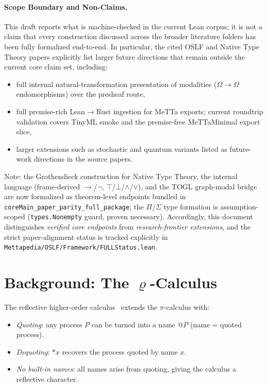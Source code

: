 \documentclass[]{article}
\newcommand{\code}[1]{\texttt{#1}}
\newcommand{\rhocalc}{\ensuremath{\varrho}}
\begin{document}
\paragraph{Scope Boundary and Non-Claims.}
This draft reports what is machine-checked in the current Lean corpus; it is
not a claim that every construction discussed across the broader literature
folders has been fully formalized end-to-end.  In particular, the cited OSLF and
Native Type Theory papers explicitly list larger future directions that remain
outside the current core claim set, including:
\begin{itemize}
\item full internal natural-transformation presentation of modalities
  (\(\Omega \to \Omega\) endomorphisms) over the presheaf route,
\item full premise-rich Lean$\to$Rust ingestion for MeTTa exports;
  current roundtrip validation covers TinyML smoke and the premise-free
  MeTTaMinimal export slice,
\item larger extensions such as stochastic and quantum variants listed as
  future-work directions in the source papers.
\end{itemize}
Note: the Grothendieck construction for Native Type Theory, the internal
language (frame-derived $\to$/$\lnot$, $\top$/$\bot$/$\land$/$\lor$), and the
TOGL graph-modal bridge are now formalized as theorem-level endpoints bundled
in \code{coreMain\_paper\_parity\_full\_package}; the $\Pi/\Sigma$ type formation
is assumption-scoped (\code{types.Nonempty} guard, proven necessary).
Accordingly, this document distinguishes \emph{verified core endpoints} from
\emph{research-frontier extensions}, and the strict paper-alignment status is
tracked explicitly in \code{Mettapedia/OSLF/Framework/FULLStatus.lean}.

\section{Background: The \rhocalc{}-Calculus}

The reflective higher-order calculus~\cite{MeredithRadestock2005} extends the
$\pi$-calculus with:
\begin{itemize}
\item \emph{Quoting}: any process $P$ can be turned into a name $@P$ (name = quoted process).
\item \emph{Dequoting}: $*x$ recovers the process quoted by name $x$.
\item \emph{No built-in names}: all names arise from quoting, giving the calculus a
  reflective character.
\end{itemize}
\end{document}
